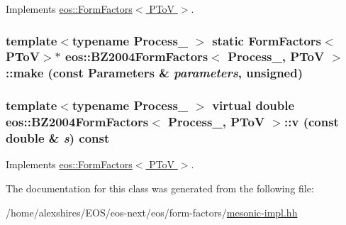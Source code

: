 Implements \hyperlink{classeos_1_1FormFactors_3_01PToV_01_4_adf8b5d0a879693460aa67feec257c959}{eos::FormFactors$<$ PToV $>$}.\hypertarget{classeos_1_1BZ2004FormFactors_3_01Process___00_01PToV_01_4_a9311fe960a5c12827dc75231db7de93f}{
\subsubsection[{make}]{\setlength{\rightskip}{0pt plus 5cm}template$<$typename Process\_\- $>$ static FormFactors$<${\bf PToV}$>$$\ast$ eos::BZ2004FormFactors$<$ Process\_\-, {\bf PToV} $>$::make (const {\bf Parameters} \& {\em parameters}, \/  unsigned)}}
\label{classeos_1_1BZ2004FormFactors_3_01Process___00_01PToV_01_4_a9311fe960a5c12827dc75231db7de93f}
\hypertarget{classeos_1_1BZ2004FormFactors_3_01Process___00_01PToV_01_4_abcc23f51780966652892e0afa138ac3d}{
\subsubsection[{v}]{\setlength{\rightskip}{0pt plus 5cm}template$<$typename Process\_\- $>$ virtual double eos::BZ2004FormFactors$<$ Process\_\-, {\bf PToV} $>$::v (const double \& {\em s}) const}}
\label{classeos_1_1BZ2004FormFactors_3_01Process___00_01PToV_01_4_abcc23f51780966652892e0afa138ac3d}


Implements \hyperlink{classeos_1_1FormFactors_3_01PToV_01_4_a1a76e6a00b424994b0b4eb86b4a8131f}{eos::FormFactors$<$ PToV $>$}.

The documentation for this class was generated from the following file:\begin{DoxyCompactItemize}
\item 
/home/alexshires/EOS/eos-\/next/eos/form-\/factors/\hyperlink{mesonic-impl_8hh}{mesonic-\/impl.hh}\end{DoxyCompactItemize}

